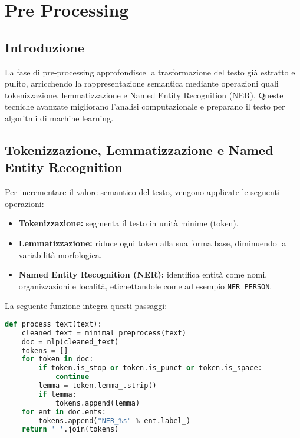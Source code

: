 \chapter{Pre Processing}

\section{Introduzione}
La fase di pre-processing approfondisce la trasformazione del testo già estratto e pulito, arricchendo la rappresentazione semantica mediante operazioni quali tokenizzazione, lemmatizzazione e Named Entity Recognition (NER). Queste tecniche avanzate migliorano l'analisi computazionale e preparano il testo per algoritmi di machine learning.

\section{Tokenizzazione, Lemmatizzazione e Named Entity Recognition}
Per incrementare il valore semantico del testo, vengono applicate le seguenti operazioni:
\begin{itemize}
    \item \textbf{Tokenizzazione:} segmenta il testo in unità minime (token).
    \item \textbf{Lemmatizzazione:} riduce ogni token alla sua forma base, diminuendo la variabilità morfologica.
    \item \textbf{Named Entity Recognition (NER):} identifica entità come nomi, organizzazioni e località, etichettandole come ad esempio \texttt{NER\_PERSON}.
\end{itemize}

La seguente funzione integra questi passaggi:

\begin{lstlisting}[language=Python,caption={Funzione per il processing del testo}]
def process_text(text):
    cleaned_text = minimal_preprocess(text)
    doc = nlp(cleaned_text)
    tokens = []
    for token in doc:
        if token.is_stop or token.is_punct or token.is_space:
            continue
        lemma = token.lemma_.strip()
        if lemma:
            tokens.append(lemma)
    for ent in doc.ents:
        tokens.append("NER_%s" % ent.label_)
    return ' '.join(tokens)
\end{lstlisting}

